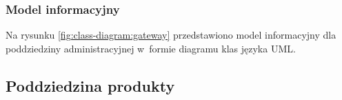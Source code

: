 \subsubsection{Model informacyjny}\label{subsubsec:database:gateway:domainModel}

Na rysunku \ref{fig:class-diagram:gateway} przedstawiono model informacyjny dla poddziedziny administracyjnej w~formie diagramu klas języka UML.


\pagebreak
\subsection{Poddziedzina produkty}\label{subsec:database:products}

